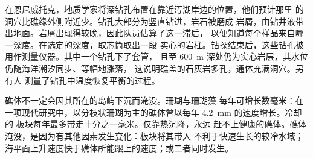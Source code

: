 \begin{inthefield}[钻探环礁]
在恩尼威托克，地质学家将深钻孔布置在靠近泻湖岸边的位置，他们预计那里
的洞穴比礁缘外侧附近少。钻孔大部分为竖直钻进，岩石被磨成
岩屑，由钻井液带出地面。岩屑出现得较晚，因此队员估算了这一滞后，
以便知道每个样品来自哪一深度。在选定的深度，取芯筒取出一段
实心的岩柱。钻探结束后，这些钻孔被用作测量仪器。其中一个钻孔下了套管，
且至 \qty{600}{m} 深处仍为实心岩层，其水位仍随海洋潮汐同步、等幅地涨落，
这说明礁盖的石灰岩多孔，通体充满洞穴。另有人
测量了钻孔中温度恢复平衡的过程。
\end{inthefield}

礁体不一定会因其所在的岛屿下沉而淹没。珊瑚与珊瑚藻
每年可增长数毫米：在一项现代研究中，以分枝状珊瑚为主的礁体曾以每年 \qty{4.2}{mm}
的速度增长。冷却的
板块每年最多带走十分之一毫米。仅靠热沉降，永远
赶不上健康的礁体。礁体淹没，是因为有其他因素发生变化：板块将其带入
不利于快速生长的较冷水域；海平面上升速度快于礁体所能跟上的速度；或二者同时发生。

